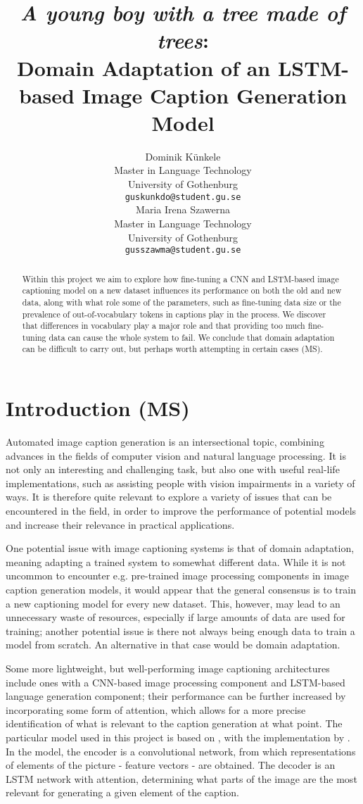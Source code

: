 \documentclass[11pt]{article}
\title{\textit{A young boy with a tree made of trees}: \\ Domain Adaptation of an LSTM-based Image Caption Generation Model}
\author{Dominik Künkele \\
  Master in Language Technology \\
  University of Gothenburg \\
  \texttt{guskunkdo@student.gu.se} \\\And
  Maria Irena Szawerna \\
  Master in Language Technology \\
  University of Gothenburg \\
  \texttt{gusszawma@student.gu.se} \\}
\begin{document}
\maketitle
\begin{abstract}

    Within this project we aim to explore how fine-tuning a CNN and LSTM-based image captioning model on a new dataset influences its performance on both the old and new data, along with what role some of the parameters, such as fine-tuning data size or the prevalence of out-of-vocabulary tokens in captions play in the process. We discover that differences in vocabulary play a major role and that providing too much fine-tuning data can cause the whole system to fail. We conclude that domain adaptation can be difficult to carry out, but perhaps worth attempting in certain cases (MS).

\end{abstract}

\section{Introduction (MS)}

Automated image caption generation is an intersectional topic, combining advances in the fields of computer vision and natural language processing. It is not only an interesting and challenging task, but also one with useful real-life implementations, such as assisting people with vision impairments in a variety of ways. It is therefore quite relevant to explore a variety of issues that can be encountered in the field, in order to improve the performance of potential models and increase their relevance in practical applications.

One potential issue with image captioning systems is that of domain adaptation, meaning adapting a trained system to somewhat different data. While it is not uncommon to encounter e.g. pre-trained image processing components in image caption generation models, it would appear that the general consensus is to train a new captioning model for every new dataset. This, however, may lead to an unnecessary waste of resources, especially if large amounts of data are used for training; another potential issue is there not always being enough data to train a model from scratch. An alternative in that case would be domain adaptation.

Some more lightweight, but well-performing image captioning architectures include ones with a CNN-based image processing component and LSTM-based language generation component; their performance can be further increased by incorporating some form of attention, which allows for a more precise identification of what is relevant to the caption generation at what point. The particular model used in this project is based on \cite{xu2015attend}, with the implementation by \cite{ilinykh}. In the model, the encoder is a convolutional network, from which representations of elements of the picture - feature vectors - are obtained. The decoder is an LSTM network with attention, determining what parts of the image are the most relevant for generating a given element of the caption.
\end{document}
